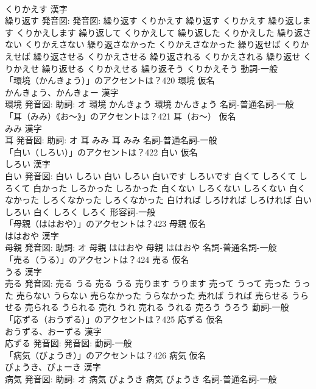 \documentclass[8pt]{extreport}
\begin{document}
\begin{CJK}{UTF8}{min}
\\	くりかえす 漢字　
\\	繰り返す 発音図: 発音図:	繰り返す くりかえす		繰り返す くりかえす 繰り返します くりかえします 繰り返して くりかえして 繰り返した くりかえした 繰り返さない くりかえさない 繰り返さなかった くりかえさなかった 繰り返せば くりかえせば 繰り返させる くりかえさせる 繰り返される くりかえされる 繰り返せ くりかえせ 繰り返せる くりかえせる 繰り返そう くりかえそう				動詞-一般 
\\	「環境（かんきょう）」のアクセントは？420	環境 仮名　
\\	かんきょう、かんきょー 漢字　
\\	環境 発音図: 助詞: オ	環境 かんきょう		環境 かんきょう				名詞-普通名詞-一般 
\\	「耳（みみ）《お〜》」のアクセントは？421	耳（お〜） 仮名　
\\	みみ 漢字　
\\	耳 発音図: 助詞: オ	耳 みみ		耳 みみ				名詞-普通名詞-一般 
\\	「白い（しろい）」のアクセントは？422	白い 仮名　
\\	しろい 漢字　
\\	白い 発音図:	白い しろい		白い しろい 白いです しろいです 白くて しろくて しろくて 白かった しろかった しろかった 白くない しろくない しろくない 白くなかった しろくなかった しろくなかった 白ければ しろければ しろければ 白い しろい 白く しろく しろく				形容詞-一般 
\\	「母親（ははおや）」のアクセントは？423	母親 仮名　
\\	ははおや 漢字　
\\	母親 発音図: 助詞: オ	母親 ははおや		母親 ははおや				名詞-普通名詞-一般 
\\	「売る（うる）」のアクセントは？424	売る 仮名　
\\	うる 漢字　
\\	売る 発音図:	売る うる		売る うる 売ります うります 売って うって 売った うった 売らない うらない 売らなかった うらなかった 売れば うれば 売らせる うらせる 売られる うられる 売れ うれ 売れる うれる 売ろう うろう				動詞-一般 
\\	「応ずる（おうずる）」のアクセントは？425	応ずる 仮名　
\\	おうずる、おーずる 漢字　
\\	応ずる 発音図: 発音図:							動詞-一般 
\\	「病気（びょうき）」のアクセントは？426	病気 仮名　
\\	びょうき、びょーき 漢字　
\\	病気 発音図: 助詞: オ	病気 びょうき		病気 びょうき				名詞-普通名詞-一般 

\end{CJK}
\end{document}
